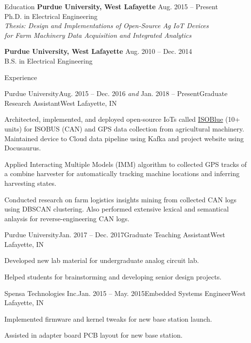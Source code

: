 \documentclass{resume}
\begin{document}
  \begin{rSection}{Education}
    {\bf Purdue University, West Lafayette} \hfill {Aug. 2015 -- Present}
    \\ 
    {Ph.D. in Electrical Engineering} \\
    \textit{Thesis: Design and Implementations of Open-Source Ag IoT Devices \\
      for Farm Machinery Data Acquisition and Integrated Analytics}

    {\bf Purdue University, West Lafayette} \hfill {Aug. 2010 -- Dec. 2014}
    \\ 
    {B.S. in Electrical Engineering} \\
  \end{rSection}

  \begin{rSection}{Experience}
    \begin{rSubsection}{Purdue University}{Aug. 2015 -- Dec. 2016 \textit{and}
        Jan. 2018 -- Present}{Graduate Research Assistant}{West Lafayette, IN}
      \item Architected, implemented, and deployed open-source IoTs called
        \href{https://www.isoblue.org/}{ISOBlue} (10+ units) for ISOBUS (CAN)
        and GPS data collection from agricultural machinery. Maintained device
        to Cloud data pipeline using Kafka and project website using
        Docusaurus.
      \item Applied Interacting Multiple Models (IMM) algorithm to collected
        GPS tracks of a combine harvester for automatically tracking machine
        locations and inferring harvesting states.
      \item Conducted research on farm logistics insights mining from collected
        CAN logs using DBSCAN clustering. Also performed extensive lexical and
        semantical anlaysis for reverse-engineering CAN logs. 
    \end{rSubsection}

    \begin{rSubsection}{Purdue University}{Jan. 2017 --
        Dec. 2017}{Graduate Teaching Assistant}{West Lafayette, IN}
      \item Developed new lab material for undergraduate analog circuit lab.
      \item Helped students for brainstorming and developing senior design
        projects. 
    \end{rSubsection}

    \begin{rSubsection}{Spensa Technologies Inc.}{Jan. 2015 --
        May. 2015}{Embedded Systems Engineer}{West Lafayette, IN}
      \item Implemented firmware and kernel tweaks for new base station launch.
      \item Assisted in adapter board PCB layout for new base station. 
    \end{rSubsection}


\end{rSection}
\end{document}
